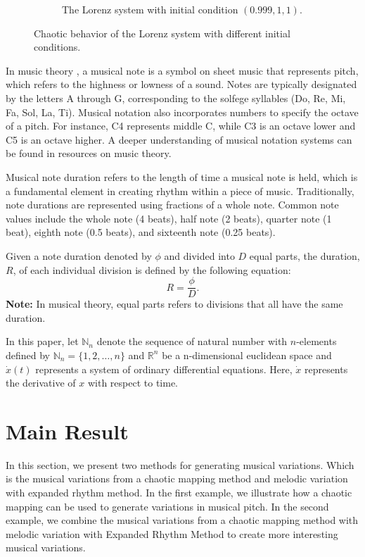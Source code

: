 \documentclass[11pt]{article}
\theoremstyle{definition}
\begin{document}
\begin{figure}
\begin{subfigure}{0.45\textwidth}
  \caption{The Lorenz system with initial condition $(0.999,1,1)$.}
  \label{subfig2:mp}
\end{subfigure}
\caption{Chaotic behavior of the Lorenz system with different initial conditions.}
\label{fig:LE}
\end{figure}

In music theory \cite{carter_music_2016}, a musical note is a symbol on sheet music that represents pitch, which refers to the highness or lowness of a sound.  Notes are typically designated by the letters A through G, corresponding to the solfege syllables (Do, Re, Mi, Fa, Sol, La, Ti).  Musical notation also incorporates numbers to specify the octave of a pitch. For instance, C4 represents middle C, while C3 is an octave lower and C5 is an octave higher. A deeper understanding of musical notation systems can be found in resources on music theory.

Musical note duration refers to the length of time a musical note is held, which is a fundamental element in creating rhythm within a piece of music.  Traditionally, note durations are represented using fractions of a whole note. Common note values include the whole note (4 beats), half note (2 beats), quarter note (1 beat), eighth note (0.5 beats), and sixteenth note (0.25 beats).

Given a note duration denoted by $\phi$ and divided into $D$ equal parts, the duration, $R$, of each individual division is defined by the following equation:
$$ R = \frac{\phi}{D}.  $$
\textbf{Note:} In musical theory, equal parts refers to divisions that all have the same duration.

In this paper, let $\mathbb{N}_n$ denote the sequence of natural number with $n$-elements defined by $\mathbb{N}_n = \{ 1, 2, \dots, n \}$ and $\mathbb{R}^n$ be a n-dimensional euclidean space and $\dot{x}(t)$ represents a system of ordinary differential equations. Here,  $\dot{x}$ represents the derivative of $x$ with respect to time.

\section{Main Result}
\label{sec: mainresult}
In this section, we present two methods for generating musical variations. Which is the musical variations from a chaotic mapping method and melodic variation with expanded rhythm method. In the first example, we illustrate how a chaotic mapping can be used to generate variations in musical pitch. In the second example, we combine the musical variations from a chaotic mapping method with melodic variation with Expanded Rhythm Method to create more interesting musical variations.
\end{document}
